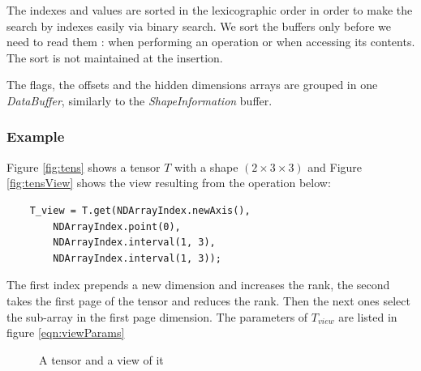 		The indexes and values are sorted in the lexicographic order in order to make the search by indexes easily via binary search. We sort the buffers only before we need to read them : when performing an operation or when accessing its contents. The sort is not maintained at the insertion.
		
		The flags, the offsets and the hidden dimensions arrays are grouped in one \textit{DataBuffer}, similarly to the \textit{ShapeInformation} buffer.
		
\subsubsection{Example}
Figure \ref{fig:tens} shows a tensor $T$ with a shape $(2\times 3\times 3)$ and Figure \ref{fig:tensView} shows the view resulting from the operation below:

\begin{lstlisting}
	T_view = T.get(NDArrayIndex.newAxis(), 
		NDArrayIndex.point(0),
		NDArrayIndex.interval(1, 3), 
		NDArrayIndex.interval(1, 3));
\end{lstlisting}

The first index prepends a new dimension and increases the rank, the second takes the first page of the tensor and reduces the rank. Then the next ones select the sub-array in the first page dimension. The parameters of $T_{view}$ are listed in figure \ref{eqn:viewParams} 

\begin{figure}[!h]
	\centering
	\qquad
	\qquad


	\caption{A tensor and a view of it }
	\label{fig:example}
\end{figure}
	
